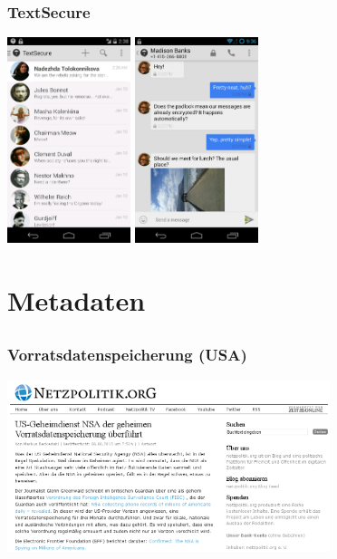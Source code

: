 \documentclass[12pt]{beamer}
\begin{document}
\begin{frame}
  \frametitle{TextSecure}
    \begin{center}
      \includegraphics[height=6cm]{img/textsecure1.png}
      \hspace{0.5cm}
      \includegraphics[height=6cm]{img/textsecure2.png}
    \end{center}
\end{frame}

\section{Metadaten}
\subsection{}

\begin{frame}
  \frametitle{Vorratsdatenspeicherung (USA)}
    \begin{center}
      \includegraphics[height=5cm]{img/netzpolitik-verizon.png}
    \end{center}
\end{frame}
\end{document}
